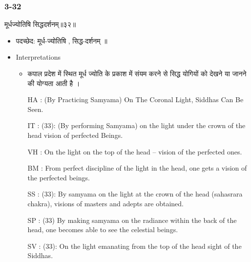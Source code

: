 \begin{frame}[fragile]\frametitle{3-32}
\begin{sanskrit}
मूर्धज्योतिषि सिद्धदर्शनम्॥३२॥
\end{sanskrit}

	\begin{itemize}
	\item पदच्छेद:  मूर्ध-ज्योतिषि , सिद्ध-दर्शनम् ॥
	\item Interpretations
		\begin{itemize}	
		\item कपाल प्रदेश में स्थित मूर्ध ज्योति के प्रकाश में संयम करने से सिद्ध योगियों को देखने या जानने की योग्यता आती है ।
		\item [HA]: (By Practicing Samyama) On The Coronal Light, Siddhas Can Be Seen.
		\item [IT]: (33): (By performing Samyama) on the light under the crown of the head vision of perfected Beings.
		\item [VH]: On the light on the top of the head – vision of the perfected ones.
		\item [BM]: From perfect discipline of the light in the head, one gets a vision of the perfected beings.
		\item [SS]: (33): By samyama on the light at the crown of the head (sahasrara chakra), visions of masters and adepts are obtained.
		\item [SP]: (33) By making samyama on the radiance within the back of the head, one becomes able to see the celestial beings.
		\item [SV]: (33): On the light emanating from the top of the head sight of the Siddhas. 
		\end{itemize}
	\end{itemize}
\end{frame}

